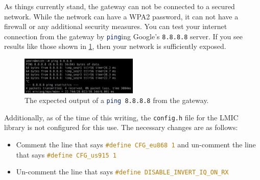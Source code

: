 As things currently stand, the gateway can not be connected to a secured network.
While the network can have a WPA2 password, it can not have a firewall or any additional security measures.
You can test your internet connection from the gateway by \lstinline[language=sh]{ping}ing Google's \lstinline[language=sh]{8.8.8.8} server.
If you see results like those shown in \cref{fig:ping}, then your network is sufficiently exposed.
\begin{figure}[ht]
  \centering
  \includegraphics[width=0.5\textwidth]{figure/ping}
  \caption{The expected output of a \lstinline[language=sh]{ping 8.8.8.8} from the gateway.}
  \label{fig:ping}
\end{figure}

Additionally, as of the time of this writing, the \lstinline{config.h} file for the LMIC library is not configured for this use.
The necessary changes are as follows:
\begin{itemize}
\item Comment the line that says \lstinline[language=C]{#define CFG_eu868 1} and un-comment the line that says \lstinline[language=C]{#define CFG_us915 1}
\item Un-comment the line that says \lstinline[language=C]{#define DISABLE_INVERT_IQ_ON_RX}
\end{itemize}

